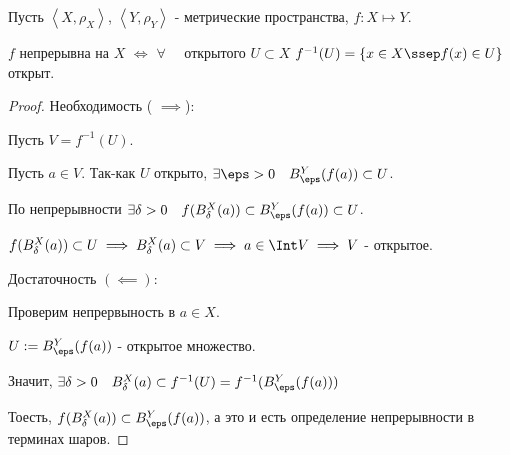 \begin{theorem} \thmslashn

    Пусть $\left<X, \rho_{X}\right>$, $\left<Y, \rho_{Y}\right>$ - метрические пространства, $f : X \mapsto Y$.

    $f$ непрерывна на $X$ $\iff$ $\forall{}\quad $ открытого $U \subset X$ $f^{-1}(U) = \{x\in X \ssep f(x)\in U\} $ открыт.
    \begin{proof} \thmslashn
    
        Необходимость ( $\implies$):

        Пусть $V = f^{-1}(U)$.

        Пусть $a\in V$. Так-как $U$ открыто, $\exists{\eps > 0}\quad B^{Y}_{\eps}(f(a)) \subset U$.

        По непрерывности $\exists{\delta > 0}\quad f(B^{X}_{\delta}(a)) \subset B^{Y}_{\eps}(f(a)) \subset U$.

        $f(B^{X}_{\delta}(a)) \subset U \implies B^{X}_{\delta}(a) \subset V \implies a\in \Int V \implies V$ - открытое.

        Достаточность $(\impliedby)$:

        Проверим непрервыность в $a\in X$.

        $U := B^{Y}_{\eps}(f(a))$ - открытое множество.

        Значит, $\exists{\delta > 0}\quad B^{X}_{\delta}(a) \subset f^{-1}(U) = f^{-1}(B^{Y}_{\eps}(f(a)))$
        
        Тоесть, $f(B^{X}_{\delta}(a)) \subset B^{Y}_{\eps}(f(a))$, а это и есть определение непрерывности в терминах шаров.
    \end{proof}
\end{theorem}
